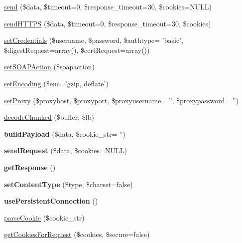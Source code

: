 \begin{DoxyCompactItemize}
\item 
\hyperlink{classsoap__transport__http_a124252f4e9d206d86fcd6522854eb919}{send} (\$data, \$timeout=0, \$response\-\_\-timeout=30, \$cookies=N\-U\-L\-L)
\item 
\hyperlink{classsoap__transport__http_aa93a72fdc90b3535f17d471b7ccc3ffd}{send\-H\-T\-T\-P\-S} (\$data, \$timeout=0, \$response\-\_\-timeout=30, \$cookies)
\item 
\hyperlink{classsoap__transport__http_afc1032cca5010f0fefba2f0d5a9c4520}{set\-Credentials} (\$username, \$password, \$authtype= 'basic', \$digest\-Request=array(), \$cert\-Request=array())
\item 
\hyperlink{classsoap__transport__http_a792db42ef189835b80389a838fbf2cef}{set\-S\-O\-A\-P\-Action} (\$soapaction)
\item 
\hyperlink{classsoap__transport__http_a9dde5d06442abd355db3acbde021121d}{set\-Encoding} (\$enc='gzip, deflate')
\item 
\hyperlink{classsoap__transport__http_a07092d2bf7866cbb464ec98726ccc75a}{set\-Proxy} (\$proxyhost, \$proxyport, \$proxyusername= '', \$proxypassword= '')
\item 
\hyperlink{classsoap__transport__http_a6dc9ad42ffb3aaea279c0ee16c4068b2}{decode\-Chunked} (\$buffer, \$lb)
\item 
\hypertarget{classsoap__transport__http_a3aaa5b45b7d75364bccaf3918a5ce908}{{\bfseries build\-Payload} (\$data, \$cookie\-\_\-str= '')}\label{classsoap__transport__http_a3aaa5b45b7d75364bccaf3918a5ce908}

\item 
\hypertarget{classsoap__transport__http_a58f0210b24415cdc753d31b425a406be}{{\bfseries send\-Request} (\$data, \$cookies=N\-U\-L\-L)}\label{classsoap__transport__http_a58f0210b24415cdc753d31b425a406be}

\item 
\hypertarget{classsoap__transport__http_a6c907e8af775e517a77037dd0164222f}{{\bfseries get\-Response} ()}\label{classsoap__transport__http_a6c907e8af775e517a77037dd0164222f}

\item 
\hypertarget{classsoap__transport__http_a1d16955b48732c7b979b7d2ccaea34c8}{{\bfseries set\-Content\-Type} (\$type, \$charset=false)}\label{classsoap__transport__http_a1d16955b48732c7b979b7d2ccaea34c8}

\item 
\hypertarget{classsoap__transport__http_a8ae21fdc1993b8741956e86fc58c12b1}{{\bfseries use\-Persistent\-Connection} ()}\label{classsoap__transport__http_a8ae21fdc1993b8741956e86fc58c12b1}

\item 
\hyperlink{classsoap__transport__http_ae8e635ed6f4df1ef3f9329f1103b6941}{parse\-Cookie} (\$cookie\-\_\-str)
\item 
\hyperlink{classsoap__transport__http_a51e28e678d231bebb7de006262c31887}{get\-Cookies\-For\-Request} (\$cookies, \$secure=false)
\end{DoxyCompactItemize}
